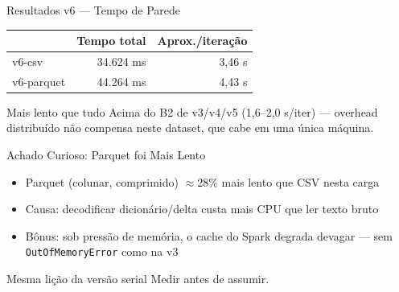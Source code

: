 \begin{frame}{Resultados v6 --- Tempo de Parede}
    \begin{center}
    \begin{tabular}{lrr}
        \toprule
        & \textbf{Tempo total} & \textbf{Aprox./iteração} \\
        \midrule
        v6-csv     & 34.624 ms & 3,46 s \\
        v6-parquet & 44.264 ms & \alert{4,43 s} \\
        \bottomrule
    \end{tabular}
    \end{center}

    \vspace{0.8em}
    \begin{alertblock}{Mais lento que tudo}
        Acima do B2 de v3/v4/v5 (1,6--2,0 s/iter) --- overhead distribuído
        não compensa neste dataset, que cabe em uma única máquina.
    \end{alertblock}
\end{frame}

\begin{frame}{Achado Curioso: Parquet foi Mais Lento}
    \begin{itemize}
        \item Parquet (colunar, comprimido) \alert{$\approx$28\% mais lento}
              que CSV nesta carga
        \item Causa: decodificar dicionário/delta custa mais CPU que ler
              texto bruto
        \item Bônus: sob pressão de memória, o cache do Spark degrada
              devagar --- sem \texttt{OutOfMemoryError} como na v3
    \end{itemize}

    \vspace{0.8em}
    \begin{block}{Mesma lição da versão serial}
        Medir antes de assumir.
    \end{block}
\end{frame}
